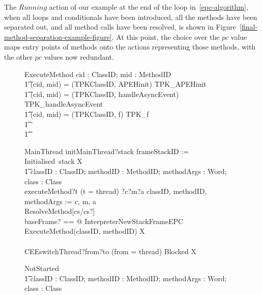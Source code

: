The $Running$ action of our example at the end of the loop
in~\ref{epc-algorithm}, when all loops and conditionals have been
introduced, all the methods have been separated out, and all method
calls have been resolved, is shown in
Figure~\ref{final-method-separation-example-figure}.
At this point, the choice over the $pc$ value maps entry points of
methods onto the actions representing those methods, with the other
$pc$ values now redundant.

\begin{figure}[t!]
  \setlength{\zedindent}{0cm}
  \setlength{\zedtab}{0.3cm}
  \setlength{\zedleftsep}{0.1cm}
  \begin{circusaction}
    ExecuteMethod \circdef \circval cid : ClassID; mid : MethodID \circspot \\
    \t1 \circif (cid, mid) = (TPKClassID, APEHinit) \circthen TPK\_APEHinit \\
    \t1 {} \circelse (cid, mid) = (TPKClassID, handleAsyncEvent) \circthen TPK\_handleAsyncEvent \\
    \t1 {} \circelse (cid, mid) = (TPKClassID, f) \circthen TPK\_f \\
    \t1 {} \cdots {} \\
    \t1 \circfi
  \end{circusaction}
  \begin{circusaction}
    MainThread \circdef initMainThread?stack \then frameStackID := Initialised~stack \circseq \circmu X \circspot \\
    \t1 \circblockbegin \circblockbegin
    \circvar classID : ClassID; methodID : MethodID; methodArgs : \seq Word; class : Class \circspot \\
    executeMethod?t \prefixcolon (t = thread) ?c?m?a \then classID, methodID, methodArgs := c, m, a \circseq \\
    \lschexpract ResolveMethod[cs/cs?] \rschexpract \circseq \\
    \lschexpract \exists baseFrame? == \true @ InterpreterNewStackFrameEPC \rschexpract \circseq \\
    ExecuteMethod(classID, methodID) \circseq X \circblockend \\
    {} \extchoice {} \\
    CEEswitchThread?from?to \prefixcolon (from = thread) \then Blocked \circseq X
    \circblockend
  \end{circusaction}
  \begin{circusaction}
    NotStarted \circdef \\
    \t1 \circvar classID : ClassID; methodID : MethodID; methodArgs : \seq Word; class : Class \circspot \\

\end{circusaction}
\end{figure}
